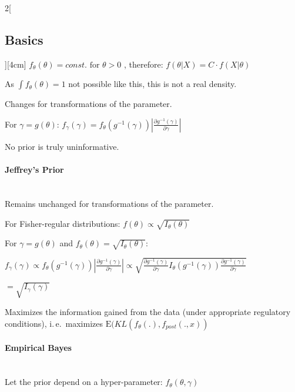 \documentclass[8pt]{extarticle}
\begin{document}
\begin{multicols}{2}[\subsection{Basics}][4cm]
\noindent $f_\theta(\theta)=const. \text{ for } \theta > 0$
,  therefore:
 $f(\theta | X) = C \cdot f(X | \theta )$

\noindent As $\int f_\theta(\theta) =1$ not possible like this, this is not a real density.

\noindent Changes for transformations of the parameter.

\begin{Proof}

\vspace{-2.3em}
\centering
For $\gamma = g(\theta)$: $f_\gamma(\gamma)=f_\theta(g^{-1}(\gamma))\left|\frac{\partial g^{-1}(\gamma)}{\partial \gamma}\right|$
\end{Proof}

 \noindent No prior is truly uninformative.


\paragraph{Jeffrey's Prior} \ \\

\noindent Remains unchanged for transformations of the parameter.

\noindent For Fisher-regular distributions: $f(\theta) \propto \sqrt{I_\theta(\theta)}$

\begin{Proof}
For $\gamma = g(\theta)$ and $f_\theta(\theta) = \sqrt{I_\theta(\theta)}$:

\noindent $f_\gamma(\gamma)  \propto f_\theta(g^{-1}(\gamma))\left|\frac{\partial g^{-1}(\gamma)}{\partial \gamma}\right| \propto \sqrt{\frac{\partial g^{-1}(\gamma)}{\partial \gamma}  I_\theta(g^{-1}(\gamma)) \frac{\partial g^{-1}(\gamma)}{\partial \gamma}}$ 

\raggedleft
$ = \sqrt{I_\gamma(\gamma)}$
\end{Proof}

\noindent\begin{minipage}{\dimexpr\linewidth}
\raggedright
Maximizes the information gained from the data (under appropriate regulatory conditions), i.\,e.\ maximizes $\mathrm{E}(KL(f_\theta(.), f_{post}(.,x))$
\end{minipage}

\paragraph{Empirical Bayes} \ \\

\noindent Let the prior depend on a hyper-parameter: $f_\theta(\theta,\gamma)$


\end{multicols}
\end{document}
